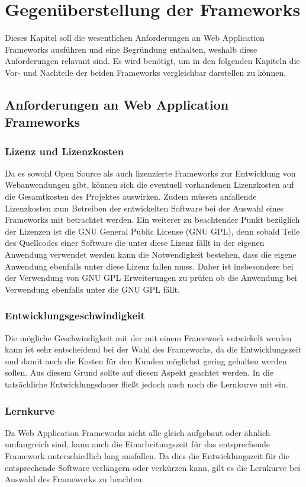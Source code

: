 \section{Gegenüberstellung der Frameworks}
Dieses Kapitel soll die wesentlichen Anforderungen an Web Application Frameworks ausführen und eine Begründung enthalten, weshalb diese Anforderungen relavant sind. Es wird benötigt, um in den folgenden Kapiteln die Vor- und Nachteile der beiden Frameworks vergleichbar darstellen zu können.
\subsection{Anforderungen an Web Application Frameworks}
\subsubsection{Lizenz und Lizenzkosten}
Da es sowohl Open Source als auch lizenzierte Frameworks zur Entwicklung von Webanwendungen gibt, können sich die eventuell vorhandenen Lizenzkosten auf die Gesamtkosten des Projektes auswirken. Zudem müssen anfallende Lizenzkosten zum Betreiben der entwickelten Software bei der Auswahl eines Frameworks mit betrachtet werden.
Ein weiterer zu beachtender Punkt bezüglich der Lizenzen ist die GNU General Public License (GNU GPL), denn sobald Teile des Quellcodes einer Software die unter diese Lizenz fällt in der eigenen Anwendung verwendet werden kann die Notwendigkeit bestehen, dass die eigene Anwendung ebenfalls unter diese Lizenz fallen muss. Daher ist insbesondere bei der Verwendung von GNU GPL Erweiterungen zu prüfen ob die Anwendung bei Verwendung ebenfalls unter die GNU GPL fällt.\autocite[S.214]{EFCMW2013} 
\subsubsection{Entwicklungsgeschwindigkeit}
Die mögliche Geschwindigkeit mit der mit einem Framework entwickelt werden kann ist sehr entscheidend bei der Wahl des Frameworks, da die Entwicklungszeit und damit auch die Kosten für den Kunden möglichst gering gehalten werden sollen. Aus diesem Grund sollte auf diesen Aspekt geachtet werden. In die tatsächliche Entwicklungsdauer fließt jedoch auch noch die Lernkurve mit ein.\autocite[S.214]{EFCMW2013}
\subsubsection{Lernkurve}
Da Web Application Frameworks nicht alle gleich aufgebaut oder ähnlich umfangreich sind, kann auch die Einarbeitungszeit für das entsprechende Framework unterschiedlich lang ausfallen. Da dies die Entwicklungszeit für die entsprechende Software verlängern oder verkürzen kann, gilt es die Lernkurve bei Auswahl des Frameworks zu beachten.\autocite[S.214]{EFCMW2013}
